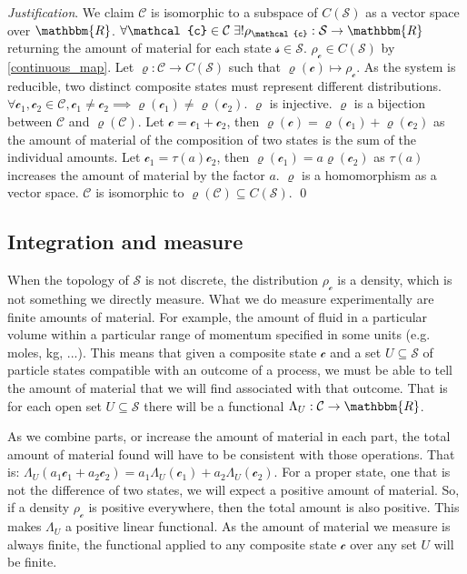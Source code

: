 \documentclass[aps,pra,10pt,twocolumn,floatfix,nofootinbib]{revtex4-1}
\numberwithin{equation}{section}
\theoremstyle{definition}
\newenvironment{justification}{\emph{Justification}.}{\qed}
\begin{document}
\begin{justification}
We claim $\mathcal{C}$ is isomorphic to a subspace of $C(\mathcal{S})$ as a vector space over $\mathbbm{R}$. $\forall \mathcal{c} \in \mathcal{C} \; \exists ! \rho_{\mathcal{c}}:\mathcal{S} \rightarrow \mathbbm{R}$ returning the amount of material for each state $\mathcal{s} \in \mathcal{S}$. $\rho_{\mathcal{c}} \in C(\mathcal{S})$ by \ref{continuous_map}. Let $\varrho : \mathcal{C} \rightarrow C(\mathcal{S})$ such that $\varrho(\mathcal{c}) \mapsto \rho_\mathcal{c}$. 
As the system is reducible, two distinct composite states must represent different distributions. $\forall \mathcal{c_1}, \mathcal{c_2} \in \mathcal{C}, \mathcal{c_1} \neq \mathcal{c_2} \implies \varrho(\mathcal{c_1}) \neq \varrho(\mathcal{c_2})$. $\varrho$ is injective. $\varrho$ is a bijection between $\mathcal{C}$ and $\varrho(\mathcal{C})$. Let $\mathcal{c}=\mathcal{c}_1+\mathcal{c}_2$, then $\varrho(\mathcal{c})=\varrho(\mathcal{c}_1)+\varrho(\mathcal{c}_2)$ as the amount of material of the composition of two states is the sum of the individual amounts. Let $\mathcal{c}_1=\tau(a)\mathcal{c}_2$, then $\varrho(\mathcal{c}_1)=a \varrho(\mathcal{c}_2)$ as $\tau(a)$ increases the amount of material by the factor $a$. $\varrho$ is a homomorphism as a vector space. $\mathcal{C}$ is isomorphic to $\varrho(\mathcal{C}) \subseteq C(\mathcal{S})$.
\end{justification}

\subsection{Integration and measure}

When the topology of $\mathcal{S}$ is not discrete, the distribution $\rho_\mathcal{c}$ is a density, which is not something we directly measure. What we do measure experimentally are finite amounts of material. For example, the amount of fluid in a particular volume within a particular range of momentum specified in some units (e.g. moles, kg, ...). This means that given a composite state $\mathcal{c}$ and a set $U \subseteq \mathcal{S}$ of particle states compatible with an outcome of a process, we must be able to tell the amount of material that we will find associated with that outcome. That is for each open set $U \subseteq \mathcal{S}$ there will be a functional $\Lambda_U : \mathcal{C} \rightarrow \mathbbm{R}$.

As we combine parts, or increase the amount of material in each part, the total amount of material found will have to be consistent with those operations. That is: $\Lambda_U(a_1 \mathcal{c}_1 + a_2 \mathcal{c}_2) = a_1 \Lambda_U(\mathcal{c}_1) + a_2 \Lambda_U(\mathcal{c}_2)$. For a proper state, one that is not the difference of two states, we will expect a positive amount of material. So, if a density $\rho_\mathcal{c}$ is positive everywhere, then the total amount is also positive. This makes $\Lambda_U$ a positive linear functional. As the amount of material we measure is always finite, the functional applied to any composite state $\mathcal{c}$ over any set $U$ will be finite.
\end{document}
